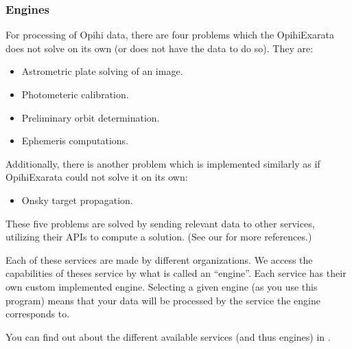 \documentclass[letterpaper,11pt,english]{sphinxmanual}
\begin{document}
\subsubsection{Engines}
\label{\detokenize{user/system_framework:engines}}
\sphinxAtStartPar
For processing of Opihi data, there are four problems which the OpihiExarata
does not solve on its own (or does not have the data to do so). They are:
\begin{itemize}
\item {} 
\sphinxAtStartPar
Astrometric plate solving of an image.

\item {} 
\sphinxAtStartPar
Photometeric calibration.

\item {} 
\sphinxAtStartPar
Preliminary orbit determination.

\item {} 
\sphinxAtStartPar
Ephemeris computations.

\end{itemize}

\sphinxAtStartPar
Additionally, there is another problem which is implemented similarly as if
OpihiExarata could not solve it on its own:
\begin{itemize}
\item {} 
\sphinxAtStartPar
On\sphinxhyphen{}sky target propagation.

\end{itemize}

\sphinxAtStartPar
These five problems are solved by sending relevant data to other services,
utilizing their APIs to compute a solution. (See our {\hyperref[\detokenize{user/citations:user-citations}]{}} for
more references.)

\sphinxAtStartPar
Each of these services are made by different organizations. We access the
capabilities of theses service by what is called an “engine”. Each service has
their own custom implemented engine. Selecting a given engine (as you use this
program) means that your data will be processed by the service the engine
corresponds to.

\sphinxAtStartPar
You can find out about the different available services (and thus engines) in
{\hyperref[\detokenize{technical/architecture/services_engines:technical-architecture-services-engines}]{}}.
\end{document}
